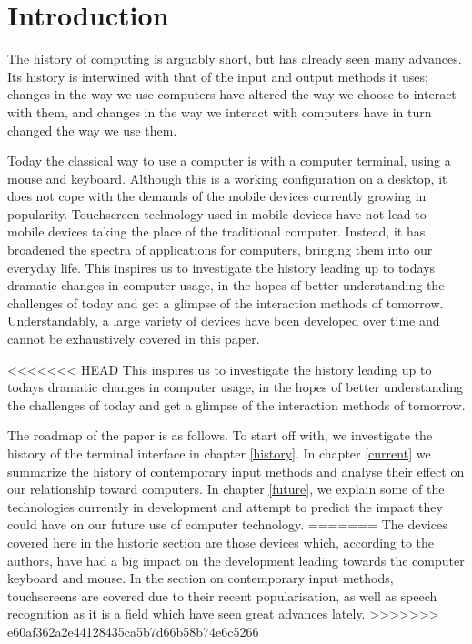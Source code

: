
\section{Introduction}

The history of computing is arguably short, but has already seen many advances. Its history is interwined with that of the input and output methods it uses; changes in the way we use computers have altered the way we choose to interact with them, and changes in the way we interact with computers have in turn changed the way we use them.

Today the classical way to use a computer is with a computer terminal, using a mouse and keyboard. Although this is a working configuration on a desktop, it does not cope with the demands of the mobile devices currently growing in popularity. Touchscreen technology used in mobile devices have not lead to mobile devices taking the place of the traditional computer. Instead, it has broadened the spectra of applications for computers, bringing them into our everyday life. This inspires us to investigate the history leading up to todays dramatic changes in computer usage, in the hopes of better understanding the challenges of today and get a glimpse of the interaction methods of tomorrow. Understandably, a large variety of devices have been developed over time and cannot be exhaustively covered in this paper.

<<<<<<< HEAD
This inspires us to investigate the history leading up to todays dramatic changes in computer usage, in the hopes of better understanding the challenges of today and get a glimpse of the interaction methods of tomorrow.



The roadmap of the paper is as follows. To start off with, we investigate the history of the terminal interface in chapter \ref{history}. In chapter \ref{current} we summarize the history of contemporary input methods and analyse their effect on our relationship toward computers. In chapter \ref{future}, we explain some of the technologies currently in development and attempt to predict the impact they could have on our future use of computer technology.
=======
The devices covered here in the historic section are those devices which, according to the authors, have had a big impact on the development leading towards the computer keyboard and mouse. In the section on contemporary input methods, touchscreens are covered due to their recent popularisation, as well as speech recognition as it is a field which have seen great advances lately. 
>>>>>>> e60af362a2e44128435ca5b7d66b58b74e6c5266

